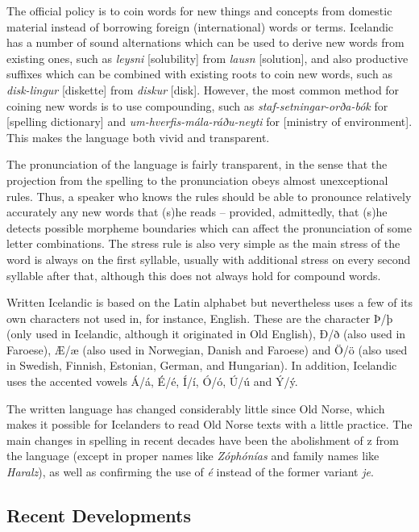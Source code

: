 \begin{multicols}{2}

The official policy is to coin words for new things and concepts from domestic material instead of borrowing foreign (international) words or terms. Icelandic has a number of sound alternations which can be used to derive new words from existing ones, such as \textit{leysni} {[}solubility{]} from \textit{lausn} {[}solution{]}, and also productive suffixes which can be combined with existing roots to coin new words, such as \textit{disk-lingur} {[}diskette{]} from \textit{diskur} {[}disk{]}. However, the most common method for coining new words is to use compounding, such as \textit{staf-setningar-orða-bók} for {[}spelling dictionary{]} and \textit{um-hverfis-mála-ráðu-neyti} for {[}ministry of environment{]}. This makes the language both vivid and transparent.

The pronunciation of the language is fairly transparent, in the sense that the projection from the spelling to the pronunciation obeys almost unexceptional rules. Thus, a speaker who knows the rules should be able to pronounce relatively accurately any new words that (s)he reads -- provided, admittedly, that (s)he detects possible morpheme boundaries which can affect the pronunciation of some letter combinations. The stress rule is also very simple as the main stress of the word is always on the first syllable, usually with additional stress on every second syllable after that, although this does not always hold for compound words. 

Written Icelandic is based on the Latin alphabet but nevertheless uses a few of its own characters not used in, for instance, English. These are the character Þ/þ (only used in Icelandic, although it originated in Old English), Ð/ð (also used in Faroese), Æ/æ (also used in Norwegian, Danish and Faroese) and Ö/ö (also used in Swedish, Finnish, Estonian, German, and Hungarian). In addition, Icelandic uses the accented vowels Á/á, É/é, Í/í, Ó/ó, Ú/ú and Ý/ý.

The written language has changed considerably little since Old Norse, which makes it possible for Icelanders to read Old Norse texts with a little practice. The main changes in spelling in recent decades have been the abolishment of z from the language (except in proper names like \textit{Zóphónías} and family names like \textit{Haralz}), as well as confirming the use of \textit{é} instead of the former variant \textit{je}.

\subsection{Recent Developments}


\end{multicols}
